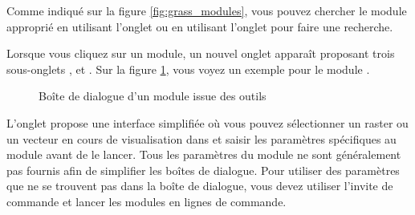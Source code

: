 {%
Comme indiqué sur la figure \ref{fig:grass_modules}, vous pouvez chercher le module \grass approprié en utilisant l'onglet  ou en utilisant l'onglet  pour faire une recherche.

Lorsque vous cliquez sur un module, un nouvel onglet apparaît proposant trois sous-onglets ,  et . Sur la figure \ref{fig:grass_module_dialog}, vous voyez un exemple pour le module \grass {}.

\begin{figure}[ht]
\centering
   \hspace{0.2cm}
    \hspace{0.2cm}
 \caption{Boîte de dialogue d'un module issue des outils \grass \nixcaption}\label{fig:grass_module_dialog}  
\end{figure}
\FloatBarrier


L'onglet  propose une interface simplifiée où vous pouvez sélectionner un raster ou un vecteur en cours de visualisation dans \qg et
saisir les paramètres spécifiques au module avant de le lancer. Tous les paramètres du module ne sont généralement pas fournis afin de simplifier
les boîtes de dialogue. Pour utiliser des paramètres que ne se trouvent pas dans la boîte de dialogue, vous devez utiliser l'invite de commande
et lancer les modules en lignes de commande.

}
